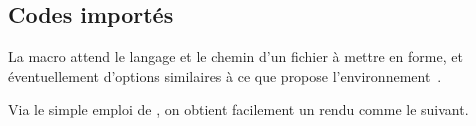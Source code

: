 \documentclass{../main/main}
\begin{document}
\subsection{Codes importés}

La macro  attend le langage et le chemin d'un fichier à mettre en forme, et éventuellement d'options similaires à ce que propose l'environnement \,.


\begin{tdocexa}
	Via le simple emploi de , on obtient facilement un rendu comme le suivant.

\end{tdocexa}


\begin{tdocexa}
	\leavevmode
\end{tdocexa}
\end{document}
